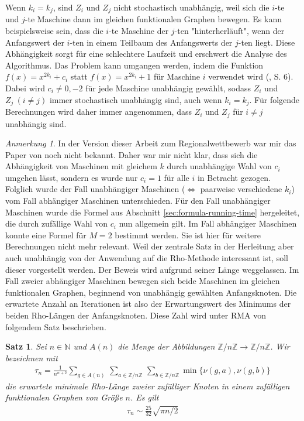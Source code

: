 \documentclass[a4paper, 11pt, ngerman]{article}
\newcommand{\N}{\mathbb{N}}
\newcommand{\Z}{\mathbb{Z}}
\theoremstyle{definition}
\theoremstyle{plain}
\newtheorem{theorem}{Satz}
\theoremstyle{remark}
\newtheorem*{remark*}{Anmerkung}
\begin{document}
Wenn $k_i = k_j$, sind $Z_i$ und $Z_j$ nicht stochastisch unabhängig, weil sich die $i$-te und $j$-te Maschine dann im gleichen funktionalen Graphen bewegen. Es kann beispielsweise sein, dass die $i$-te Maschine der $j$-ten "hinterherläuft", wenn der Anfangswert der $i$-ten in einem Teilbaum des Anfangswerts der $j$-ten liegt. Diese Abhängigkeit sorgt für eine schlechtere Laufzeit und erschwert die Analyse des Algorithmus. Das Problem kann umgangen werden, indem die Funktion $f(x) = x^{2k_i} + c_i$ statt $f(x) = x^{2k_i} + 1$ für Maschine $i$ verwendet wird (\cite{cr99}, S. 6). Dabei wird $c_i \ne 0, -2$ für jede Maschine unabhängig gewählt, sodass $Z_i$ und $Z_j \ (i \ne j)$ immer stochastisch unabhängig sind, auch wenn $k_i = k_j$. Für folgende Berechnungen wird daher immer angenommen, dass $Z_i$ und $Z_j$ für $i \ne j$ unabhängig sind.

\begin{remark*}
    In der Version dieser Arbeit zum Regionalwettbewerb war mir das Paper von \cite{cr99} noch nicht bekannt. Daher war mir nicht klar, dass sich die Abhängigkeit von Maschinen mit gleichem $k$ durch unabhängige Wahl von $c_i$ umgehen lässt, sondern es wurde nur $c_i = 1$ für alle $i$ in Betracht gezogen. Folglich wurde der Fall unabhängiger Maschinen ($\Longleftrightarrow$ paarweise verschiedene $k_i$) vom Fall abhängiger Maschinen unterschieden. Für den Fall unabhängiger Maschinen wurde die Formel aus Abschnitt \ref{sec:formula-running-time} hergeleitet, die durch zufällige Wahl von $c_i$ nun allgemein gilt. Im Fall abhängiger Maschinen konnte eine Formel für $M = 2$ bestimmt werden. Sie ist hier für weitere Berechnungen nicht mehr relevant. Weil der zentrale Satz in der Herleitung aber auch unabhängig von der Anwendung auf die Rho-Methode interessant ist, soll dieser vorgestellt werden. Der Beweis wird aufgrund seiner Länge weggelassen. Im Fall zweier abhängiger Maschinen bewegen sich beide Maschinen im gleichen funktionalen Graphen, beginnend von unabhängig gewählten Anfangsknoten. Die erwartete Anzahl an Iterationen ist also der Erwartungswert des Minimums der beiden Rho-Längen der Anfangsknoten. Diese Zahl wird unter RMA von folgendem Satz beschrieben.
\end{remark*}

\begin{theorem}
    \label{theorem:min-rho-len-m2}
    Sei $n \in \N$ und $A(n)$ die Menge der Abbildungen $\Z/n\Z \to \Z/n\Z$. Wir bezeichnen mit
    \begin{align*}
        \tau_n =  \frac 1 {n^{n + 2}}
        \sum_{g \in A(n)} \, \sum_{a \in \Z/n\Z} \, \sum_{b \in \Z/n\Z}
        \min\{\nu(g, a), \nu(g, b)\}
    \end{align*}
    die erwartete minimale Rho-Länge zweier zufälliger Knoten in einem zufälligen funktionalen Graphen von Größe $n$.  Es gilt
    \begin{align*}
        \tau_n \sim \frac {25} {32} \sqrt{\pi n / 2}
    \end{align*}
\end{theorem}
\end{document}
